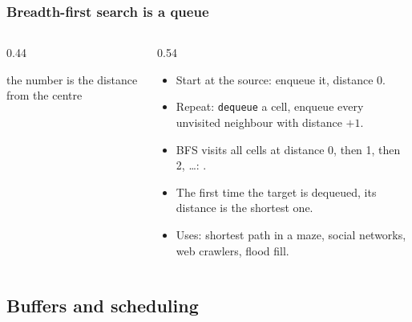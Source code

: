 \documentclass[aspectratio=169,10pt,compress]{beamer}
\begin{document}
\begin{frame}[t,fragile] \frametitle{Breadth-first search is a queue}
  \begin{columns}[T]
    \begin{column}{0.44\textwidth}
      \begin{center}
      \end{center}
      \scriptsize the number is the distance from the centre
    \end{column}
    \begin{column}{0.54\textwidth}
      \begin{itemize}\small
        \item Start at the source: enqueue it, distance 0.
        \item Repeat: \texttt{dequeue} a cell, enqueue every unvisited neighbour with distance $+1$.
        \item BFS visits all cells at distance 0, then 1, then 2, \dots: .
        \item The first time the target is dequeued, its distance is the shortest one.
        \item Uses: shortest path in a maze, social networks, web crawlers, flood fill.
      \end{itemize}
    \end{column}
  \end{columns}
\end{frame}

\subsection[Buffers]{Buffers and scheduling}
\end{document}
